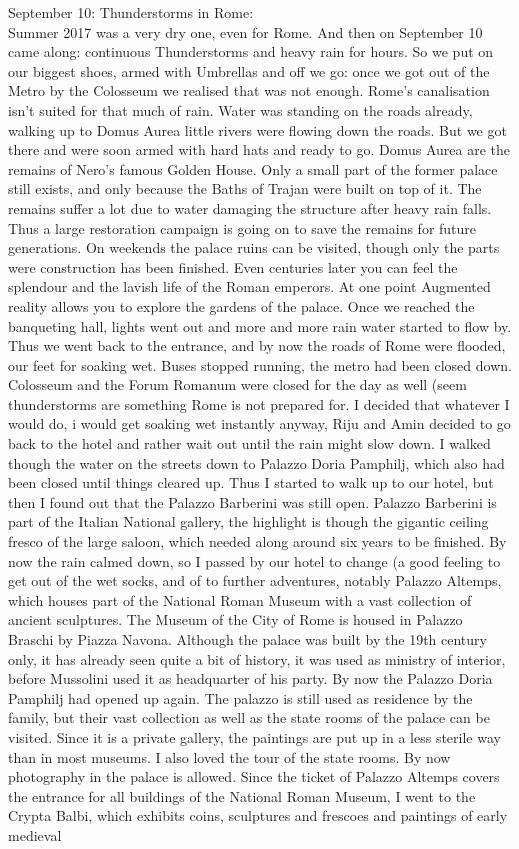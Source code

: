 September 10: Thunderstorms in Rome:\\
Summer 2017 was a very dry one, even for Rome. And then on September 10 came along: continuous Thunderstorms and heavy rain for hours. So we put on our biggest shoes, armed with Umbrellas and off we go: once we got out of the Metro by the Colosseum we realised that was not enough. Rome's canalisation isn't suited for that much of rain. Water was standing on the roads already, walking up to Domus Aurea little rivers were flowing down the roads. But we got there and were soon armed with hard hats and ready to go. Domus Aurea are the remains of Nero's famous Golden House. Only a small part of the former palace still exists, and only because the Baths of Trajan were built on top of it. The remains suffer a lot due to water damaging the structure after heavy rain falls. Thus a large restoration campaign is going on to save the remains for future generations. On weekends the palace ruins can be visited, though only the parts were construction has been finished. Even centuries later you can feel the splendour and the lavish life of the Roman emperors. At one point Augmented reality allows you to explore the gardens of the palace. Once we reached the banqueting hall, lights went out and more and more rain water started to flow by. Thus we went back to the entrance, and by now the roads of Rome were flooded, our feet for soaking wet. Buses stopped running, the metro had been closed down. Colosseum and the Forum Romanum were closed for the day as well (seem thunderstorms are something Rome is not prepared for. I decided that whatever I would do, i would get soaking wet instantly anyway, Riju and Amin decided to go back to the hotel and rather wait out until the rain might slow down. I walked though the water on the streets down to Palazzo Doria Pamphilj, which also had been closed until things cleared up. Thus I started to walk up to our hotel, but then I found out that the Palazzo Barberini was still open. Palazzo Barberini is part of the Italian National gallery, the highlight is though the gigantic ceiling fresco of the large saloon, which needed along around six years to be finished. By now the rain calmed down, so I passed by our hotel to change (a good feeling to get out of the wet socks, and of to further adventures, notably Palazzo Altemps, which houses part of the National Roman Museum with a vast collection of ancient sculptures. The Museum of the City of Rome is housed in Palazzo Braschi by Piazza Navona. Although the palace was built by the 19th century only, it has already seen quite a bit of history, it was used as ministry of interior, before Mussolini used it as headquarter of his party. By now the Palazzo Doria Pamphilj had opened up again. The palazzo is still used as residence by the family, but their vast collection as well as the state rooms of the palace can be visited. Since it is a private gallery, the paintings are put up in a less sterile way than in most museums. I also loved the tour of the state rooms. By now photography in the palace is allowed. Since the ticket of Palazzo Altemps covers the entrance for all buildings of the National Roman Museum, I went to the Crypta Balbi, which exhibits coins, sculptures and frescoes and paintings of early medieval 